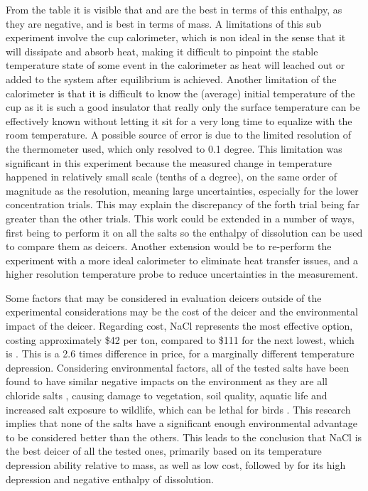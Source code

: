 \documentclass[12pt, letterpaper]{article}
\begin{document}
\FloatBarrier
\vspace{-24pt}
From the table it is visible that  and  are the best in terms of this enthalpy, as they are negative, and  is best in terms of mass.  A limitations of this sub experiment involve the cup calorimeter, which is non ideal in the sense that it will dissipate and absorb heat, making it difficult to pinpoint the stable temperature state of some event in the calorimeter as heat will leached out or added to the system after equilibrium is achieved. Another limitation of the calorimeter is that it is difficult to know the (average) initial temperature of the cup as it is such a good insulator that really only the surface temperature can be effectively known without letting it sit for a very long time to equalize with the room temperature. A possible source of error is due to the limited resolution of the thermometer used, which only resolved to 0.1 degree. This limitation was significant in this  experiment because the measured change in temperature happened in relatively small scale (tenths of a degree), on the same order of magnitude as the resolution, meaning large uncertainties, especially for the lower concentration trials. This may explain the discrepancy of the forth trial being far greater than the other trials. This work could be extended in a number of ways, first being to perform it on all the salts so the enthalpy of dissolution can be used to compare them as deicers. Another extension would be to re-perform the experiment with a more ideal calorimeter to eliminate heat transfer issues, and a higher resolution temperature probe to reduce uncertainties in the measurement.\\\par 
\vspace{-24pt}
Some factors that may be considered in evaluation deicers outside of the experimental considerations may be the cost of the deicer and the environmental impact of the deicer.
Regarding cost, NaCl represents the most effective option, costing approximately \$42 per ton, compared to \$111 for the next lowest, which is  \cite{cost}. This is a 2.6 times difference in price, for a marginally different temperature depression. Considering environmental factors, all of the tested salts have been found to have similar negative impacts on the environment as they are all chloride salts \cite{bad}, causing damage to vegetation, soil quality, aquatic life and increased salt exposure to wildlife, which can be lethal for birds \cite{birds}. This research implies that none of the salts have a significant enough environmental advantage to be considered better than the others. This leads to the conclusion that NaCl is the best deicer of all the tested ones, primarily based on its temperature depression ability relative to mass, as well as low cost, followed by  for its high depression and negative enthalpy of dissolution.
\end{document}
